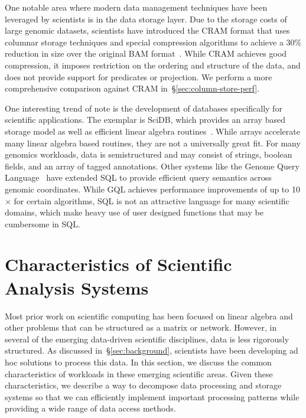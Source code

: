 \documentclass{acm_proc_article-sp}
\begin{document}
One notable area where modern data management techniques have been leveraged by scientists is in
the data storage layer. Due to the storage costs of large genomic datasets, scientists have introduced the
CRAM format that uses columnar storage techniques and special compression algorithms to achieve a
30\% reduction in size over the original BAM format~\cite{fritz11}. While CRAM achieves good
compression, it imposes restriction on the ordering and structure of the data, and does not provide
support for predicates or projection. We perform a more comprehensive comparison against CRAM
in~\S\ref{sec:column-store-perf}.

One interesting trend of note is the development of databases specifically for scientific applications.
The exemplar is \linebreak SciDB, which provides an array based storage model as well as efficient
linear algebra routines~\cite{brown10}. While arrays accelerate many linear algebra based routines, they
are not a universally great fit. For many genomics workloads, data is semistructured and may consist of
strings, boolean fields, and an array of tagged annotations. Other systems like the Genome Query
Language~\cite{kozanitis14} have extended SQL to provide efficient query semantics across genomic
coordinates. While GQL achieves performance improvements of up to 10$\times$ for certain algorithms,
SQL is not an attractive language for many scientific domains, which make heavy use of user designed
functions that may be cumbersome in SQL.

\pagebreak

\section{Characteristics of Scientific \\ Analysis Systems}
\label{sec:principles}

Most prior work on scientific computing has been focused on linear algebra and other problems that can
be structured as a matrix or network. However, in several of the emerging data-driven scientific
disciplines, data is less rigorously structured. As discussed
in~\S\ref{sec:background}, scientists have been developing ad hoc solutions to process this data. In this
section, we discuss the common characteristics of workloads in these emerging scientific areas. Given
these characteristics, we describe a way to decompose data processing and storage systems so that
we can efficiently implement important processing patterns while providing a wide range of data access
methods.
\end{document}
